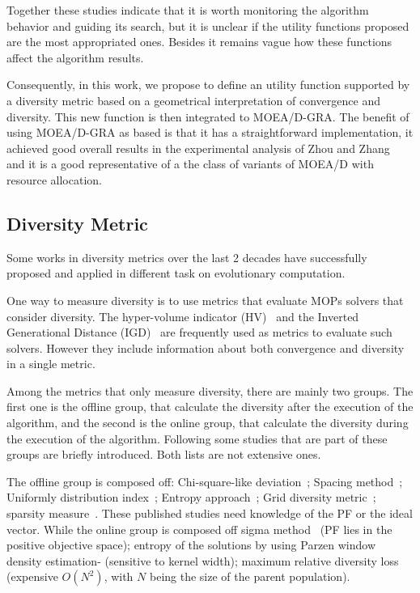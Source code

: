 Together these studies indicate that it is worth monitoring the algorithm behavior and guiding its search, but it is unclear if the utility functions proposed are the most appropriated ones. Besides it remains vague how these functions affect the algorithm results.

Consequently, in this work, we propose to define an utility function supported by a diversity metric based on a geometrical interpretation of convergence and diversity. This new function is then integrated to MOEA/D-GRA. The benefit of using MOEA/D-GRA as based is that it has a straightforward implementation, it achieved good overall results in the experimental analysis of Zhou and Zhang~\cite{zhou2016all}  and it is a good representative of a the class of variants of MOEA/D with resource allocation.

\subsection{Diversity Metric}

Some works in diversity metrics over the last 2 decades have successfully  proposed and applied in different task on evolutionary computation. 




One way to measure diversity is to use metrics that evaluate MOPs solvers that consider diversity. The hyper-volume indicator (HV)~\cite{zitzler1998multiobjective} and the Inverted Generational Distance (IGD)~\cite{zhang2008rm} are frequently used as metrics to evaluate such solvers. However they include information about both convergence and diversity in a single metric.

Among the metrics that only measure diversity, there are mainly two groups. The first one is the offline group, that calculate the diversity after the execution of the algorithm, and the second is the online group, that calculate the diversity during the execution of the algorithm. Following some studies that are part of these groups are briefly introduced. Both lists are not extensive ones.

 The offline group is composed off: Chi-square-like deviation~\cite{deb1989genetic}; Spacing method~\cite{scott1995fault}; Uniformly distribution index~\cite{tan2002evolutionary}; Entropy approach~\cite{farhang2002diversity}; Grid diversity metric~\cite{deb2002running}; sparsity measure~\cite{deb2003fast}. These published studies need knowledge of the PF or the ideal vector. While the online group is composed off sigma method~\cite{mostaghim2003strategies}  (PF lies in the positive objective space); entropy of the solutions by using Parzen window density estimation-\cite{tan2008evolutionary} (sensitive to kernel width); maximum relative diversity loss~\cite{gee2015online} (expensive $O(N^2)$, with $N$ being the size of the parent population).

